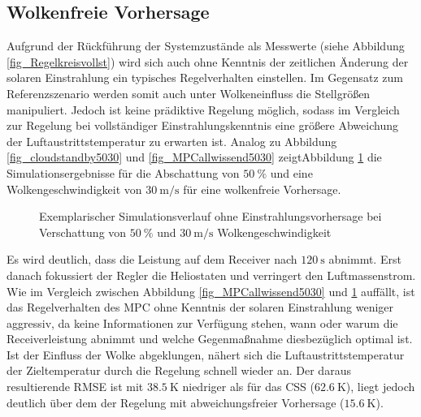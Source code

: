 \subsection{Wolkenfreie Vorhersage} \label{subsec_wolkenfreivorhergesagt}
Aufgrund der Rückführung der Systemzustände als Messwerte (siehe Abbildung \ref{fig_Regelkreisvollst}) wird sich auch ohne Kenntnis der zeitlichen Änderung der solaren Einstrahlung ein typisches Regelverhalten einstellen.
Im Gegensatz zum Referenzszenario werden somit auch unter Wolkeneinfluss die Stellgrößen manipuliert.
Jedoch ist keine prädiktive Regelung möglich, sodass im Vergleich zur Regelung bei vollständiger Einstrahlungskenntnis eine größere Abweichung der Luftaustrittstemperatur zu erwarten ist.
Analog zu Abbildung \ref{fig_cloudstandby5030} und \ref{fig_MPCallwissend5030} zeigt\linebreak Abbildung \ref{fig_unwissend5030} die Simulationsergebnisse für die Abschattung von $\SI{50}{\percent}$ und eine Wolkengeschwindigkeit von $\SI{30}{\metre\per\second}$ für eine wolkenfreie Vorhersage.

\begin{figure}[h!]
    \centering
    \setlength{\fboxsep}{1pt}
    \setlength{\fboxrule}{1pt}
\caption[Exemplarischer Simulationsverlauf ohne Einstrahlungsvorhersage bei Verschattung von $\SI{50}{\percent}$ und $\SI{30}{\metre\per\second}$ Wolkengeschwindigkeit]{Exemplarischer Simulationsverlauf ohne Einstrahlungsvorhersage bei Verschattung von $\SI{50}{\percent}$ und $\SI{30}{\metre\per\second}$ Wolkengeschwindigkeit}
    \label{fig_unwissend5030}
\end{figure}

Es wird deutlich, dass die Leistung auf dem Receiver nach $\SI{120}{\second}$ abnimmt.
Erst danach fokussiert der Regler die Heliostaten und verringert den Luftmassenstrom.
Wie im Vergleich zwischen Abbildung  \ref{fig_MPCallwissend5030} und \ref{fig_unwissend5030} auffällt, ist das Regelverhalten des MPC ohne Kenntnis der solaren Einstrahlung weniger aggressiv, da keine Informationen zur Verfügung stehen, wann oder warum die Receiverleistung abnimmt und welche Gegenmaßnahme diesbezüglich optimal ist.
Ist der Einfluss der Wolke abgeklungen, nähert sich die Luftaustrittstemperatur der Zieltemperatur durch die Regelung schnell wieder an.
Der daraus resultierende RMSE ist mit $\SI{38.5}{\kelvin}$ niedriger als für das CSS ($\SI{62.6}{\kelvin}$), liegt jedoch deutlich über dem der Regelung mit abweichungsfreier Vorhersage ($\SI{15.6}{\kelvin}$).

